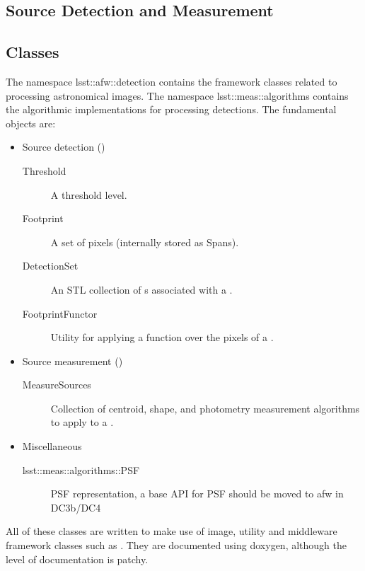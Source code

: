
\subsection{Source Detection and Measurement}

\subsection{Classes}

The namespace lsst::afw::detection contains the framework classes related to 
processing astronomical images. The namespace lsst::meas::algorithms contains
the algorithmic implementations for processing detections.
The fundamental objects are:\begin{itemize}
\item Source detection ()
\begin{description}
    \item[Threshold] A threshold level.
    \item[Footprint] A set of pixels (internally stored as Spans).
    \item[DetectionSet] An STL collection of s associated 
        with a .
    \item[FootprintFunctor] Utility for applying a function over the pixels of
        a .
\end{description}
\item Source measurement ()
\begin{description}
    \item[MeasureSources] Collection of centroid, shape, and photometry 
        measurement algorithms to apply to a .
\end{description}
\item Miscellaneous
\begin{description}
    \item[lsst::meas::algorithms::PSF] PSF representation, a base API for
        PSF should be moved to afw in DC3b/DC4
    \end{description}
\end{itemize}

All of these classes are written to make use of image, utility and middleware
framework classes such as . They are 
documented using doxygen, although the level of documentation is patchy.

